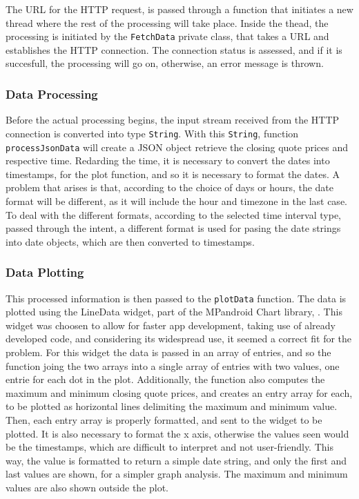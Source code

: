 \documentclass{article}
\begin{document}
The URL for the HTTP request, is passed through a function that initiates a new thread where the rest of the processing will take place.
Inside the thead, the processing is initiated by the \texttt{FetchData} private class, that takes a URL and establishes the HTTP connection.
The connection status is assessed, and if it is succesfull, the processing will go on, otherwise, an error message is thrown.

\subsubsection{Data Processing}
Before the actual processing begins, the input stream received from the HTTP connection is converted into type \texttt{String}.
With this \texttt{String}, function \texttt{processJsonData} will create a JSON object retrieve the closing quote prices and respective time.
Redarding the time, it is necessary to convert the dates into timestamps, for the plot function, and so it is necessary to format the dates.
A problem that arises is that, according to the choice of days or hours, the date format will be different, as it will include the hour and timezone in the last case.
To deal with the different formats, according to the selected time interval type, passed through the intent, a different format is used for pasing the date strings into date objects, which are then converted to timestamps.

\subsubsection{Data Plotting}
This processed information is then passed to the \texttt{plotData} function.
The data is plotted using the LineData widget, part of the MPandroid Chart library, \cite{MPAndroidChart}.
This widget was choosen to allow for faster app development, taking use of already developed code, and considering its widespread use, it seemed a correct fit for the problem.
For this widget the data is passed in an array of entries, and so the function joing the two arrays into a single array of entries with two values, one entrie for each dot in the plot.
Additionally, the function also computes the maximum and minimum closing quote prices, and creates an entry array for each, to be plotted as horizontal lines delimiting the maximum and minimum value.
Then, each entry array is properly formatted, and sent to the widget to be plotted.
It is also necessary to format the x axis, otherwise the values seen would be the timestamps, which are difficult to interpret and not user-friendly.
This way, the value is formatted to return a simple date string, and only the first and last values are shown, for a simpler graph analysis.
The maximum and minimum values are also shown outside the plot.
\end{document}
